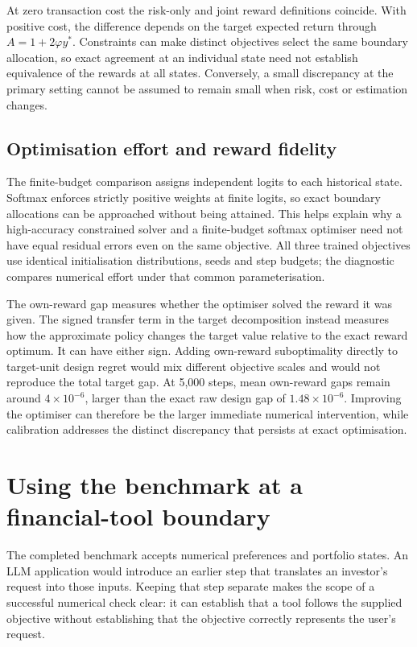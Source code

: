 \documentclass[sigconf,anonymous,review]{acmart}
\begin{document}
At zero transaction cost the risk-only and joint reward definitions coincide. With positive cost, the difference depends on the target expected return through $A=1+2\varphi y^*$. Constraints can make distinct objectives select the same boundary allocation, so exact agreement at an individual state need not establish equivalence of the rewards at all states. Conversely, a small discrepancy at the primary setting cannot be assumed to remain small when risk, cost or estimation changes.

\subsection{Optimisation effort and reward fidelity}
The finite-budget comparison assigns independent logits to each historical state. Softmax enforces strictly positive weights at finite logits, so exact boundary allocations can be approached without being attained. This helps explain why a high-accuracy constrained solver and a finite-budget softmax optimiser need not have equal residual errors even on the same objective. All three trained objectives use identical initialisation distributions, seeds and step budgets; the diagnostic compares numerical effort under that common parameterisation.

The own-reward gap measures whether the optimiser solved the reward it was given. The signed transfer term in the target decomposition instead measures how the approximate policy changes the target value relative to the exact reward optimum. It can have either sign. Adding own-reward suboptimality directly to target-unit design regret would mix different objective scales and would not reproduce the total target gap. At 5,000 steps, mean own-reward gaps remain around $4\times10^{-6}$, larger than the exact raw design gap of $1.48\times10^{-6}$. Improving the optimiser can therefore be the larger immediate numerical intervention, while calibration addresses the distinct discrepancy that persists at exact optimisation.

\section{Using the benchmark at a financial-tool boundary}
The completed benchmark accepts numerical preferences and portfolio states. An LLM application would introduce an earlier step that translates an investor's request into those inputs. Keeping that step separate makes the scope of a successful numerical check clear: it can establish that a tool follows the supplied objective without establishing that the objective correctly represents the user's request.
\end{document}
